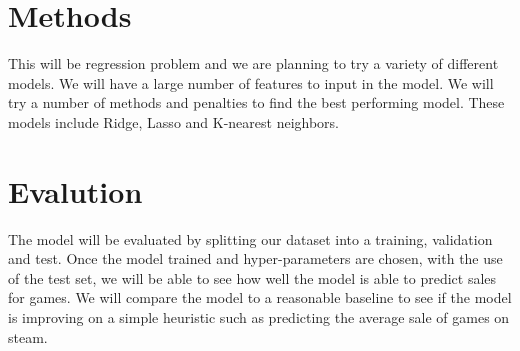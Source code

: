 \documentclass[11pt]{article}
\begin{document}
\section{Methods}
\label{sec:org703c2f8}

This will be regression problem and we are planning to try a variety of different models. We will have a large number of features to input in the model. We will try a number of methods and penalties to find the best performing model. These models include Ridge, Lasso and K-nearest neighbors.

\section{Evalution}
\label{sec:org6efa636}

The model will be evaluated by splitting our dataset into a training, validation and test.  Once the model trained and hyper-parameters are chosen, with the use of the test set, we will be able to see how well the model is able to predict sales for games. We will compare the model to a reasonable baseline to see if the model is improving on a simple heuristic such as predicting the average sale of games on steam. 
\end{document}
